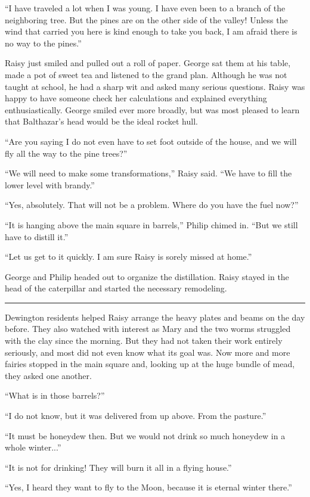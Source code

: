 \documentclass[10pt, draft]{memoir}
\renewcommand{\pfbreakdisplay}{\bigskip \ding{166} \bigskip}
\newcommand{\secbreak}{\fancybreak{\pfbreakdisplay}}
\begin{document}
``I have traveled a lot when I was young. I have even been to a branch of the neighboring tree. But the pines are on the other side of the valley! Unless the wind that carried you here is kind enough to take you back, I am afraid there is no way to the pines.''

Raisy just smiled and pulled out a roll of paper. George sat them at his table, made a pot of sweet tea and listened to the grand plan. Although he was not taught at school, he had a sharp wit and asked many serious questions. Raisy was happy to have someone check her calculations and explained everything enthusiastically. George smiled ever more broadly, but was most pleased to learn that Balthazar's head would be the ideal rocket hull.

``Are you saying I do not even have to set foot outside of the house, and we will fly all the way to the pine trees?''

``We will need to make some transformations,'' Raisy said. ``We have to fill the lower level with brandy.''

``Yes, absolutely. That will not be a problem. Where do you have the fuel now?''

``It is hanging above the main square in barrels,” Philip chimed in. “But we still have to distill it.''

``Let us get to it quickly. I am sure Raisy is sorely missed at home.''

George and Philip headed out to organize the distillation. Raisy stayed in the head of the caterpillar and started the necessary remodeling.

\secbreak

Dewington residents helped Raisy arrange the heavy plates and beams on the day before. They also watched with interest as Mary and the two worms struggled with the clay since the morning. But they had not taken their work entirely seriously, and most did not even know what its goal was. Now more and more fairies stopped in the main square and, looking up at the huge bundle of mead, they asked one another.

``What is in those barrels?''

``I do not know, but it was delivered from up above. From the pasture.''

``It must be honeydew then. But we would not drink so much honeydew in a whole winter...''

``It is not for drinking! They will burn it all in a flying house.''

``Yes, I heard they want to fly to the Moon, because it is eternal winter there.''
\end{document}
